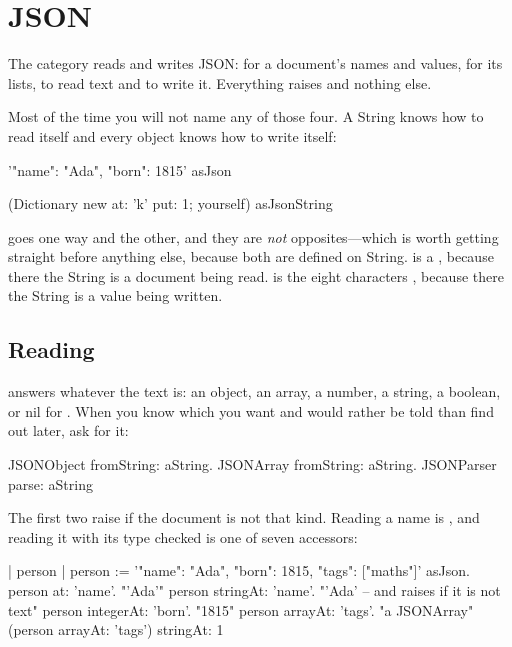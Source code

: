 \chapter{JSON}
\label{ch:json}


The  category reads and writes JSON:  for a document's
names and values,  for its lists,  to read text
and  to write it. Everything raises  and nothing
else.

Most of the time you will not name any of those four. A String knows how to
read itself and every object knows how to write itself:

\begin{st}
'{"name": "Ada", "born": 1815}' asJson
\end{st}

\begin{st}
(Dictionary new at: 'k' put: 1; yourself) asJsonString
\end{st}

 goes one way and  the other, and they are
\emph{not} opposites---which is worth getting straight before anything else,
because both are defined on String.  is a ,
because there the String is a document being read. 
is the eight characters , because there the String is a value
being written.

\section{Reading}

 answers whatever the text is: an object, an array, a number, a
string, a boolean, or nil for . When you know which you want and
would rather be told than find out later, ask for it:

\begin{st}
JSONObject fromString: aString.
JSONArray fromString: aString.
JSONParser parse: aString
\end{st}

The first two raise if the document is not that kind. Reading a name is
, and reading it with its type checked is one of seven accessors:

\begin{st}
| person |
person := '{"name": "Ada", "born": 1815, "tags": ["maths"]}' asJson.
person at: 'name'.                  "'Ada'"
person stringAt: 'name'.            "'Ada' -- and raises if it is not text"
person integerAt: 'born'.           "1815"
person arrayAt: 'tags'.             "a JSONArray"
(person arrayAt: 'tags') stringAt: 1
\end{st}

